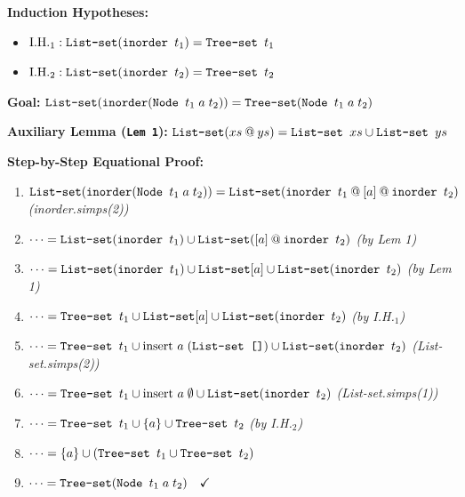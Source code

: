 \documentclass[10pt,a4paper]{article}
\begin{document}
\begin{tcolorbox}[title={3. Step Case ($t = \text{Node } t_1 \; a \; t_2$)}]
\textbf{Induction Hypotheses:}
\begin{itemize}[leftmargin=1.2em, itemsep=2pt]
    \item $\text{I.H.}_1: \text{\texttt{List-set}}(\text{\texttt{inorder }} t_1) = \text{\texttt{Tree-set }} t_1$
    \item $\text{I.H.}_2: \text{\texttt{List-set}}(\text{\texttt{inorder }} t_2) = \text{\texttt{Tree-set }} t_2$
\end{itemize}
\textbf{Goal:} $\text{\texttt{List-set}}(\text{\texttt{inorder}}(\text{\texttt{Node }} t_1 \; a \; t_2)) = \text{\texttt{Tree-set}}(\text{\texttt{Node }} t_1 \; a \; t_2)$

\vspace{0.3em}
\textbf{Auxiliary Lemma (\texttt{Lem 1}):} $\text{\texttt{List-set}}(xs \mathbin{@} ys) = \text{\texttt{List-set }} xs \cup \text{\texttt{List-set }} ys$

\vspace{0.3em}
\textbf{Step-by-Step Equational Proof:}
\begin{enumerate}[leftmargin=1.5em, itemsep=2pt]
    \item $\text{\texttt{List-set}}(\text{\texttt{inorder}}(\text{\texttt{Node }} t_1 \; a \; t_2)) = \text{\texttt{List-set}}(\text{\texttt{inorder }} t_1 \mathbin{@} [a] \mathbin{@} \text{\texttt{inorder }} t_2)$ \quad \textit{(inorder.simps(2))}
    \item $\dots = \text{\texttt{List-set}}(\text{\texttt{inorder }} t_1) \cup \text{\texttt{List-set}}([a] \mathbin{@} \text{\texttt{inorder }} t_2)$ \quad \textit{(by Lem 1)}
    \item $\dots = \text{\texttt{List-set}}(\text{\texttt{inorder }} t_1) \cup \text{\texttt{List-set}}[a] \cup \text{\texttt{List-set}}(\text{\texttt{inorder }} t_2)$ \quad \textit{(by Lem 1)}
    \item $\dots = \text{\texttt{Tree-set }} t_1 \cup \text{\texttt{List-set}}[a] \cup \text{\texttt{List-set}}(\text{\texttt{inorder }} t_2)$ \quad \textit{(by I.H.$_1$)}
    \item $\dots = \text{\texttt{Tree-set }} t_1 \cup \text{insert } a \; (\text{\texttt{List-set []}}) \cup \text{\texttt{List-set}}(\text{\texttt{inorder }} t_2)$ \quad \textit{(List-set.simps(2))}
    \item $\dots = \text{\texttt{Tree-set }} t_1 \cup \text{insert } a \; \emptyset \cup \text{\texttt{List-set}}(\text{\texttt{inorder }} t_2)$ \quad \textit{(List-set.simps(1))}
    \item $\dots = \text{\texttt{Tree-set }} t_1 \cup \{a\} \cup \text{\texttt{Tree-set }} t_2$ \quad \textit{(by I.H.$_2$)}
    \item $\dots = \{a\} \cup (\text{\texttt{Tree-set }} t_1 \cup \text{\texttt{Tree-set }} t_2)$
    \item $\dots = \text{\texttt{Tree-set}}(\text{\texttt{Node }} t_1 \; a \; t_2) \quad \checkmark$
\end{enumerate}
\end{tcolorbox}
\end{document}
